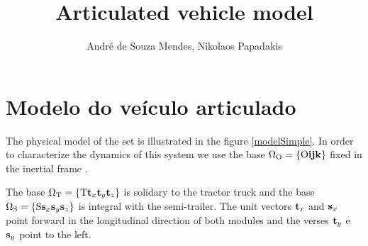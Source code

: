 \documentclass[sublist]{fei}
\author{André de Souza Mendes, Nikolaos Papadakis}
\title{Articulated vehicle model}
\begin{document}
\maketitle












\section{Modelo do veículo articulado}

The physical model of the set is illustrated in the figure \ref{modelSimple}. In order to characterize the dynamics of this system we use the base \( \Omega_{\rm O} = \{ {\rm O} {\bf i} {\bf j} {\bf k} \}\) fixed in the inertial frame .

The base  \( \Omega_{\rm T} = \{ {\rm T} {\bf t}_x {\bf t}_y {\bf t}_z \}\)  is solidary to the tractor truck and the base \( \Omega_{\rm S} = \{ {\rm S} {\bf s}_x {\bf s}_y {\bf s}_z \}\)  is integral with the semi-trailer. The unit vectors  \({\bf t}_x\) and \({\bf s}_x\) point forward in the longitudinal direction of both modules and the verses \({\bf t}_y\) e \({\bf s}_y\) point to the left. 
\end{document}
